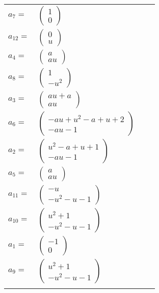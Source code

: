 \documentclass[1p]{elsarticle_modified}
\theoremstyle{definition}
\begin{document}
\begin{tabular}{m{7pt} m{180pt} m{7pt} m{180pt} }
\flushright $a_{7}=$&$\begin{pmatrix}1\\0\end{pmatrix}$ \\
\flushright $a_{12}=$&$\begin{pmatrix}0\\u\end{pmatrix}$ \\
\flushright $a_{4}=$&$\begin{pmatrix}a\\a u\end{pmatrix}$ \\
\flushright $a_{8}=$&$\begin{pmatrix}1\\- u^2\end{pmatrix}$ \\
\flushright $a_{3}=$&$\begin{pmatrix}a u+a\\a u\end{pmatrix}$ \\
\flushright $a_{6}=$&$\begin{pmatrix}- a u+u^2- a+u+2\\- a u-1\end{pmatrix}$ \\
\flushright $a_{2}=$&$\begin{pmatrix}u^2- a+u+1\\- a u-1\end{pmatrix}$ \\
\flushright $a_{5}=$&$\begin{pmatrix}a\\a u\end{pmatrix}$ \\
\flushright $a_{11}=$&$\begin{pmatrix}- u\\- u^2- u-1\end{pmatrix}$ \\
\flushright $a_{10}=$&$\begin{pmatrix}u^2+1\\- u^2- u-1\end{pmatrix}$ \\
\flushright $a_{1}=$&$\begin{pmatrix}-1\\0\end{pmatrix}$ \\
\flushright $a_{9}=$&$\begin{pmatrix}u^2+1\\- u^2- u-1\end{pmatrix}$\\&\end{tabular}
\end{document}
